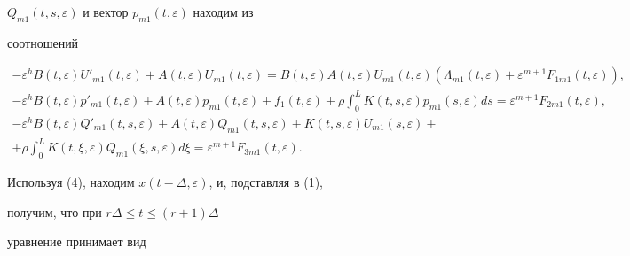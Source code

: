 $Q_{m1}(t,s,\varepsilon)$ и вектор $p_{m1}(t,\varepsilon)$ находим из 


соотношений 


\begin{gather*} 


-\varepsilon^h B(t,\varepsilon)U'_{m1}(t,\varepsilon)+ 


A(t,\varepsilon)U_{m1}(t,\varepsilon)=B(t,\varepsilon) 


A(t,\varepsilon)U_{m1}(t,\varepsilon) 


(\Lambda_{m1}(t,\varepsilon)+\varepsilon^{m+1} 


F_{1m1}(t,\varepsilon)), \\ 


% 


-\varepsilon^h B(t,\varepsilon)p'_{m1}(t,\varepsilon)+ 


A(t,\varepsilon)p_{m1}(t,\varepsilon)+f_1(t,\varepsilon) 


+\rho\int^L_0 K(t,s,\varepsilon)p_{m1}(s,\varepsilon)ds 


=\varepsilon^{m+1}F_{2m1}(t,\varepsilon), \\ 


% 


-\varepsilon^h B(t,\varepsilon)Q'_{m1}(t,s,\varepsilon)+ 


A(t,\varepsilon)Q_{m1}(t,s,\varepsilon)+ 


K(t,s,\varepsilon)U_{m1}(s,\varepsilon)+ \\ 


+\rho\int^L_0 K(t,\xi,\varepsilon)Q_{m1}(\xi,s,\varepsilon) 


d\xi=\varepsilon^{m+1}F_{3m1}(t,\varepsilon). 


\end{gather*} 


 


Используя (4), находим $x(t-\Delta,\varepsilon)$, и, подставляя в (1), 


получим, что при $r\Delta\le t\le(r+1)\Delta$ 


уравнение принимает вид 


